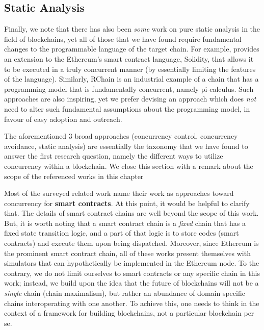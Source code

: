 \subsection*{Static Analysis}

Finally, we note that there has also been \textit{some} work on pure static analysis in the field of
blockchains, yet all of those that we have found require fundamental changes to the programmable
language of the target chain. For example, \cite{bartolettiTrueConcurrentModel2019} provides an
extension to the Ethereum's smart contract language, Solidity, that allows it to be executed in a
truly concurrent manner (by essentially limiting the features of the language). Similarly, RChain is
an industrial example of a chain that has a programming model that is fundamentally
concurrent\cite{darrylRCast21Currency2019}, namely
pi-calculus\cite{turnerPolymorphicPiCalculusTheory1996}. Such approaches are also inspiring, yet we
prefer devising an approach which does \textit{not} need to alter such fundamental assumptions about
the programming model, in favour of easy adoption and outreach.

The aforementioned 3 broad approaches (concurrency control, concurrency avoidance, static analysis)
are essentially the taxonomy that we have found to answer the first research question, namely the
different ways to utilize concurrency within a blockchain. We close this section with a remark about
the scope of the referenced works in this chapter

\begin{remark}
	Most of the surveyed related work name their work as approaches toward concurrency for
	\textbf{smart contracts}. At this point, it would be helpful to clarify that. The details of
	smart contract chains are well beyond the scope of this work. But, it is worth noting that a
	smart contract chain is a \textit{fixed} chain that has a fixed state transition logic, and a
	part of that logic is to store codes (smart contracts) and execute them upon being dispatched.
	Moreover, since Ethereum is the prominent smart contract chain, all of these works present
	themselves with simulators that can hypothetically be implemented in the Ethereum node. To the
	contrary, we do not limit ourselves to smart contracts or any specific chain in this work;
	instead, we build upon the idea that the future of blockchains will not be a \textit{single}
	chain (chain maximalism), but rather an abundance of domain specific chains interoperating with
	one another. To achieve this, one needs to think in the context of a framework for building
	blockchains, not a particular blockchain per se.
\end{remark}

